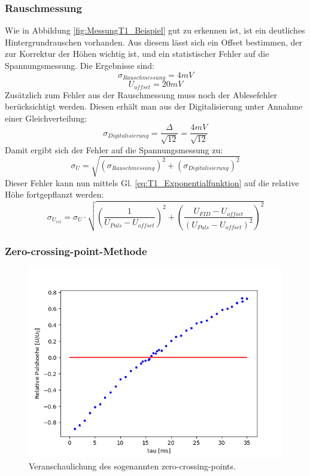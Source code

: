 \documentclass[12pt,a4paper]{article}
\begin{document}
\subsubsection{Rauschmessung}
Wie in Abbildung \ref{fig:MessungT1_Beispiel} gut zu erkennen ist, ist ein deutliches Hintergrundrauschen vorhanden. Aus diesem lässt sich ein Offset bestimmen, der zur Korrektur der Höhen wichtig ist, und ein statistischer Fehler auf die Spannungsmessung. Die Ergebnisse sind:
\begin{equation*}
\sigma _{Rauschmessung} = 4 mV
\end{equation*}
\begin{equation*}
U_{offset} = 20 mV
\end{equation*}
Zusätzlich zum Fehler aus der Rauschmessung muss noch der Ablesefehler berücksichtigt werden. Diesen erhält man aus der Digitalisierung unter Annahme einer Gleichverteilung:
\begin{equation*}
\sigma _{Digitalisierung} = \dfrac{\Delta}{\sqrt{12}} = \dfrac{4 mV}{\sqrt{12}}
\end{equation*}
Damit ergibt sich der Fehler auf die Spannungsmessung zu:
\begin{equation*}
\sigma _U = \sqrt{\left(\sigma _{Rauschmessung} \right)^2 + \left(\sigma _{Digitalisierung} \right)^2}
\end{equation*}
Dieser Fehler kann nun mittels Gl. \ref{eq:T1_Exponentialfunktion} auf die relative Höhe fortgepflanzt werden:
\begin{equation*}
\sigma _{U_{rel}} = \sigma _U \cdot \sqrt{\left(\dfrac{1}{U_{Puls} - U_{offset}}\right)^2 + \left(\dfrac{U_{FID} - U_{offset}}{(U_{Puls} - U_{offset})^2}\right)^2}
\end{equation*}


\subsubsection{Zero-crossing-point-Methode}
\label{T1zcp}

\begin{figure}
\centering
\includegraphics[scale=0.7]{Bilder/T1_ZeroCrossingPoint.PNG}
\caption{Veranschaulichung des sogenannten zero-crossing-points.}
\label{fig:T1_Zero_Crossing}
\end{figure}
\end{document}
